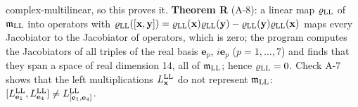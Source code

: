 \documentclass[
  10pt,
]{article}
\begin{document}
complex-multilinear, so this proves it. \textbf{Theorem R} (A-8): a
linear map \(\varrho_{\rm LL}\) of \(\mathfrak m_{\rm LL}\) into
operators with
\(\varrho_{\rm LL}([\mathbf x,\mathbf y])=\varrho_{\rm LL}(\mathbf x)\varrho_{\rm LL}(\mathbf y)-\varrho_{\rm LL}(\mathbf y)\varrho_{\rm LL}(\mathbf x)\)
maps every Jacobiator to the Jacobiator of operators, which is zero; the
program computes the Jacobiators of all triples of the real basis
\(\mathbf e_p\), \(i\mathbf e_p\) (\(p=1,\dots,7\)) and finds that they
span a space of real dimension 14, all of \(\mathfrak m_{\rm LL}\);
hence \(\varrho_{\rm LL}=0\). Check A-7 shows that the left
multiplications \(L^{\rm LL}_{\mathbf x}\) do not represent
\(\mathfrak m_{\rm LL}\):
\([L^{\rm LL}_{\mathbf e_1},L^{\rm LL}_{\mathbf e_4}]\neq L^{\rm LL}_{[\mathbf e_1,\mathbf e_4]}\).
\end{document}
